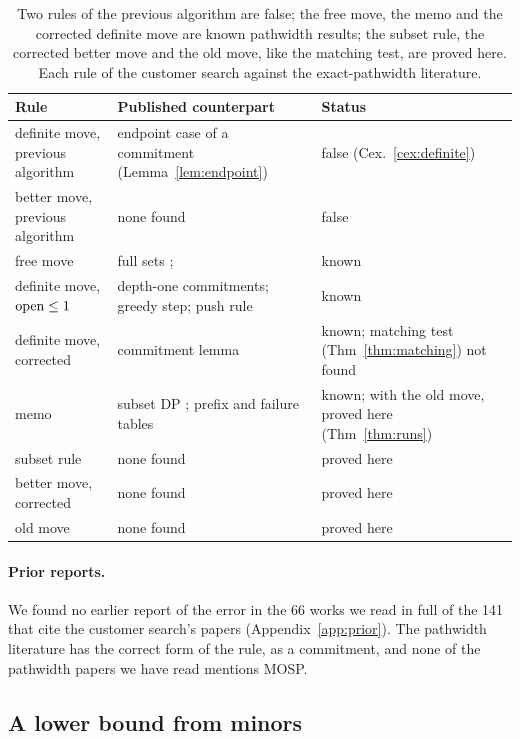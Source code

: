 \begin{table}[t]
\centering\small
\caption{Two rules of the previous algorithm are false; the free move, the memo and the
corrected definite move are known pathwidth results; the subset rule, the
corrected better move and the old move, like the matching test, are proved here.
Each rule of the customer search against the exact-pathwidth literature.}
\label{tab:known}
\begin{tabularx}{\linewidth}{@{}>{\raggedright}p{3.2cm}>{\raggedright}X>{\raggedright\arraybackslash}p{4.1cm}@{}}
\toprule
Rule & Published counterpart & Status \\
\midrule
definite move, previous algorithm & endpoint case of a commitment (Lemma~\ref{lem:endpoint}) & false (Cex.~\ref{cex:definite}) \\
better move, previous algorithm & none found & false \\
\midrule
free move & full sets \citep{SuchanVillanger2009}; \citet[Prop.~3]{Kitsunai2016} & known \\
definite move, $\mathrm{open}\le1$ & depth-one commitments; greedy step; push rule & known \\
definite move, corrected & commitment lemma \citep[Lemma~1]{Kitsunai2016} & known; matching test (Thm~\ref{thm:matching}) not found \\
memo & subset DP \citep{Bodlaender2012}; prefix and failure tables & known; with the old move, proved here (Thm~\ref{thm:runs}) \\
\midrule
subset rule & none found & proved here \\
better move, corrected & none found & proved here \\
old move & none found & proved here \\
\bottomrule
\end{tabularx}
\end{table}

\paragraph{Prior reports.} We found no earlier report of the error in the 66
works we read in full of the 141 that cite the customer search's papers
(Appendix~\ref{app:prior}). The pathwidth literature has the correct form of
the rule, as a commitment, and none of the pathwidth papers we have read mentions
MOSP.

\subsection{A lower bound from minors}
\label{sec:minor}

